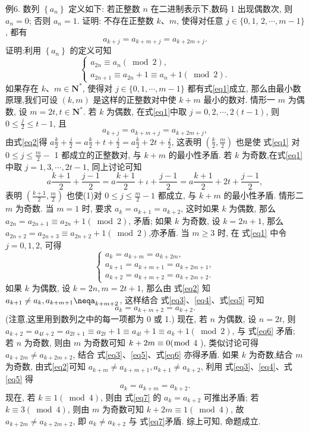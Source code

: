 例6. 数列 $\left\{a_n\right\}$ 定义如下: 若正整数 $n$ 在二进制表示下,数码 1 出现偶数次, 则 $a_n=0$; 否则 $a_n=1$. 证明: 不存在正整数 $k 、 m$, 使得对任意 $j \in\{0,1$, $2, \cdots, m-1\}$, 都有
$$
a_{k+j}=a_{k+m+j}=a_{k+2 m+j} . \label{eq1}
$$
证明:利用 $\left\{a_n\right\}$ 的定义可知
$$
\left\{\begin{array}{l}
a_{2 n} \equiv a_n(\bmod 2), \\
a_{2 n+1} \equiv a_{2 n}+1 \equiv a_n+1(\bmod 2) .
\end{array}\right. \label{eq2}
$$
如果存在 $k 、 m \in \mathbf{N}^*$, 使得对 $j \in\{0,1, \cdots, m-1\}$ 都有式\ref{eq1}成立, 那么由最小数原理,我们可设 $(k, m)$ 是这样的正整数对中使 $k+m$ 最小的数对.
情形一 $m$ 为偶数, 设 $m=2 t, t \in \mathbf{N}^*$.
若 $k$ 为偶数, 在式\ref{eq1}中取 $j=0,2, \cdots, 2(t-1)$, 则 $0 \leqslant \frac{j}{2} \leqslant t-1$, 且
$$
a_{k+j}=a_{k+m+j}=a_{k+2 m+j},
$$
由式\ref{eq2}得 $a \frac{k}{2}+\frac{j}{2}=a \frac{k}{2}+t+\frac{j}{2}=a \frac{k}{2}+2 t+\frac{j}{2}$, 这表明 $\left(\frac{k}{2}, \frac{m}{2}\right)$ 也是使 式\ref{eq1} 对 $0 \leqslant j \leqslant \frac{m}{2}-$ 1 都成立的正整数对, 与 $k+m$ 的最小性矛盾.
若 $k$ 为奇数,在式\ref{eq1}中取 $j=1,3, \cdots, 2 t-1$, 同上讨论可知
$$
a \frac{k+1}{2}+\frac{j-1}{2}=a \frac{k+1}{2}+\iota+\frac{j-1}{2}=a \frac{k+1}{2}+2 t+\frac{j-1}{2},
$$
表明 $\left(\frac{k+1}{2}, \frac{m}{2}\right)$ 也使(1)对 $0 \leqslant j \leqslant \frac{m}{2}-1$ 都成立, 与 $k+m$ 的最小性矛盾.
情形二 $m$ 为奇数.
当 $m=1$ 时, 要求 $a_k=a_{k+1}=a_{k+2}$, 这时如果 $k$ 为偶数, 那么 $a_{2 n}= a_{2 n+1} \equiv a_{2 n}+1(\bmod 2)$, 矛盾; 如果 $k$ 为奇数, 设 $k=2 n+1$, 那么 $a_{2 n+2}= a_{2 n+3} \equiv a_{2 n+2}+1(\bmod 2)$,亦矛盾.
当 $m \geqslant 3$ 时, 在 式\ref{eq1} 中令 $j=0,1,2$, 可得
$$
\left\{\begin{array}{l}
a_k=a_{k+m}=a_{k+2 m}, \label{eq3}\\
a_{k+1}=a_{k+m+1}=a_{k+2 m+1}, \label{eq4}\\
a_{k+2}=a_{k+m+2}=a_{k+2 m+2} . \label{eq5}
\end{array}\right.
$$
如果 $k$ 为偶数, 设 $k=2 n, m=2 t+1$, 那么由 式\ref{eq2} 知 $a_{k+1} \neq a_k, a_{k+m+1} \neqa_{k+m+2}$, 这样结合 式\ref{eq3}、\ref{eq4}、式\ref{eq5} 可知
$$
a_k=a_{k+m+2}=a_{k+2} . \label{eq6}
$$
(注意,这里用到数列之中的每一项都为 0 或 1.)
现在, 若 $n$ 为偶数, 设 $n=2 t$, 则 $a_{k+2}=a_{4 t+2}=a_{2 t+1} \equiv a_{2 t}+1 \equiv a_{4 t}+1 \equiv a_k+1(\bmod 2)$, 与 式\ref{eq6} 矛盾; 若 $n$ 为奇数, 则由 $m$ 为奇数可知 $k+2 m \equiv 0(\bmod$ 4 ), 类似讨论可得 $a_{k+2 m} \neq a_{k+2 m+2}$, 结合 式\ref{eq3}、\ref{eq5}、式\ref{eq6} 亦得矛盾.
如果 $k$ 为奇数,结合 $m$ 为奇数, 由式\ref{eq2}可知 $a_{k+m} \neq a_{k+m+1}, a_{k+1} \neq a_{k+2}$, 利用 式\ref{eq3}、\ref{eq4}、式\ref{eq5} 得
$$
a_k=a_{k+m}=a_{k+2} .
$$
现在, 若 $k \equiv 1(\bmod 4)$, 则由 式\ref{eq7} 的 $a_k=a_{k+2}$ 可推出矛盾; 若 $k \equiv 3(\bmod 4)$, 则由 $m$ 为奇数可知 $k+2 m \equiv 1(\bmod 4)$, 故 $a_{k+2 m} \neq a_{k+2 m+2}$, 即 $a_k \neq a_{k+2}$ 与 式\ref{eq7}矛盾.
综上可知, 命题成立.


